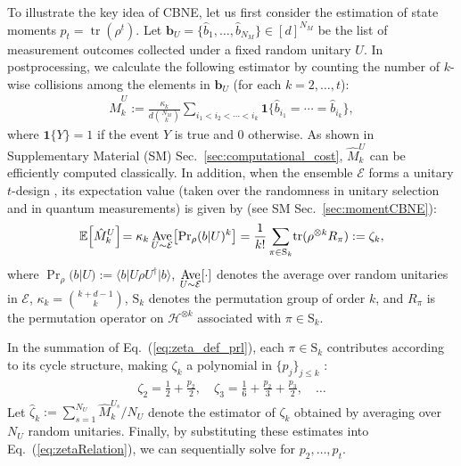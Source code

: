 \documentclass[aps,prl,twocolumn,nofootinbib,superscriptaddress,10pt]{revtex4-2}
\let\originalleft\left
\let\originalright\right
\renewcommand{\left}{\mathopen{}\mathclose\bgroup\originalleft}
\renewcommand{\right}{\aftergroup\egroup\originalright}
\def\E{ {\mathbb E} } %
\def\>{\rangle}
\def\<{\langle}
\DeclareMathOperator{\Tr}{tr}
\theoremstyle{plain}
\theoremstyle{definition}
\newcommand{\caH}{\mathcal{H}}
\newcommand{\eref}[1]{Eq.~\textup{(\ref{#1})}}
\begin{document}
To illustrate the key idea of CBNE, let us first consider the estimation of state moments $p_t = \Tr(\rho^t)$.
Let $\mathbf{b}_U=\{\hat{b}_1,\dots,\hat{b}_{N_M}\}\in[d]^{N_M}$ be the list of measurement outcomes collected under a fixed random unitary \(U\).
In postprocessing, we calculate the following estimator by counting the number of \( k \)-wise collisions among the elements in \( \mathbf{b}_U \)  (for each $k=2,\dots,t$): 
\begin{align}\label{eq:collision_moment_prl}
	\hat M_k^U
	:=
	\frac{\kappa_k}{d\binom{N_M}{k}}
	\sum_{i_1<i_2<\cdots<i_k}
	\mathbf{1}\{\hat{b}_{i_1}=\cdots=\hat{b}_{i_k}\}, 
\end{align}
where $\textbf{1}\{Y\}=1$ if the event $Y$ is true and 0 otherwise.
As shown in Supplementary Material (SM) Sec.~\ref{sec:computational_cost}, $\hat M_k^U$ can be efficiently computed classically.
In addition, when the ensemble $\mathcal E$ forms a unitary $t$-design \cite{Mele23}, its expectation value (taken over the randomness in unitary selection and in quantum measurements) is given by (see SM Sec.~\ref{sec:momentCBNE}): 
\begin{align}\label{eq:zeta_def_prl}
\E \left[\hat M_k^U\right]\!=
\kappa_k \, \underset{U\sim \mathcal E}{\rm Ave} \left[{\Pr}_{\rho}(b|U)^k\right]
= \frac{1}{k!}\sum_{\pi\in \mathrm{S}_k}\!\Tr(\rho^{\otimes k}R_\pi) :=\zeta_k,
\end{align}
where $\Pr_{\rho}(b|U):=\<b|U\rho U^\dag|b\>$, $\underset{U\sim \mathcal E}{\rm Ave}[\cdot]$ denotes the average over random unitaries in $\mathcal E$, $\kappa_k=\binom{k+d-1}{k}$, 
$\mathrm{S}_k$ denotes the permutation group of order $k$, 
and $R_\pi$ is the permutation operator on $\caH^{\otimes k}$ %
associated with $\pi\in \mathrm{S}_k$.  


In the summation of \eref{eq:zeta_def_prl}, each $\pi \in \mathrm{S}_k$ contributes according to its cycle structure, making $\zeta_k$ a polynomial in $\{p_j\}_{j \le k}$ \cite{PhysRevLett.108.110503}: 
\begin{align}\label{eq:zetaRelation}
\zeta_2= \frac{1}{2}+\frac{p_2}{2}, \quad  
\zeta_3= \frac{1}{6}+\frac{p_2}{3}+\frac{p_3}{2}, \quad  \dots 
\end{align} 
Let $\hat{\zeta}_k := \sum_{s=1}^{N_U} \hat{M}_k^{U_s}/N_U$ denote the estimator of $\zeta_k$ obtained by averaging over $N_U$ random unitaries.
Finally, by substituting these estimates into \eref{eq:zetaRelation}, we can sequentially solve for $p_2,\dots,p_t$.
\end{document}
